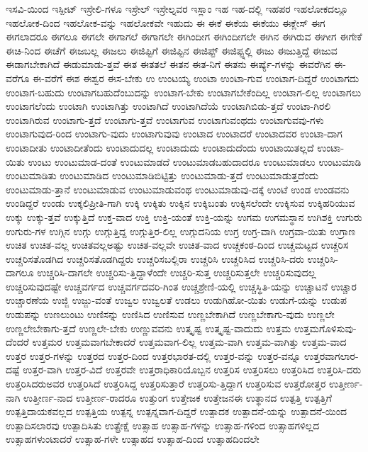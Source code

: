 {ಇಸವಿ-ಯಿಂದ
ಇಸ್ಪೀಟ್
ಇಸ್ರೇಲಿ-ಗಳೂ
ಇಸ್ರೇಲ್
ಇಸ್ರೇಲ್ನವರ
ಇಸ್ಲಾಂ
ಇಹ
ಇಹ-ದಲ್ಲಿ
ಇಹಪರ
ಇಹಲೋಕದಲ್ಲೂ
ಇಹಲೋಕ-ದಿಂದ
ಇಹಲೋಕ-ವನ್ನು
ಇಹಲೋಕವೇ
ಇಹುದು
ಈ
ಈಕೆ
ಈಕೆಯ
ಈಕೆಯು
ಈಕ್ಲೇಸ್
ಈಗ
ಈಗಲಾದರೂ
ಈಗಲೂ
ಈಗಲೇ
ಈಗಾಗಲೆ
ಈಗಾಗಲೇ
ಈಗಿಂದೀಗ
ಈಗಿಂದೀಗಲೇ
ಈಗಿನ
ಈಗಿರುವ
ಈಗೀಗ
ಈಗೇಕೆ
ಈಚಿ-ನಿಂದ
ಈಚೆಗೆ
ಈಜಬಲ್ಲ
ಈಜಲು
ಈಜಿಪ್ಟಿಗೆ
ಈಜಿಪ್ಟಿನ
ಈಜಿಪ್ಟ್
ಈಜಿಪ್ಟ್ನಲ್ಲಿ
ಈಜು
ಈಜುತ್ತಿದ್ದೆ
ಈಜುವ
ಈಡಾಗಬೇಕಾಗಿದೆ
ಈಡುಮಾಡು-ತ್ತವೆ
ಈತ
ಈತತಲೆ
ಈತನ
ಈತ-ನಿಗೆ
ಈತನು
ಈರ್ಷ್ಯೆ-ಗಳನ್ನು
ಈವರೆಗಿನ
ಈ-ವರೆಗೂ
ಈ-ವರೆಗೆ
ಈಶ
ಈಶ್ವರ
ಈಸ-ಬೇಕು
ಉ
ಉಂಟಯ್ಯ
ಉಂಟಾ
ಉಂಟಾ-ಗುವ
ಉಂಟಾಗ-ದಿದ್ದರೆ
ಉಂಟಾಗದು
ಉಂಟಾಗ-ಬಹುದು
ಉಂಟಾಗಬಹುದೆಂಬುದನ್ನು
ಉಂಟಾಗ-ಬೇಕು
ಉಂಟಾಗಬೇಕೆಂದಿಲ್ಲ
ಉಂಟಾಗ-ಲಿಲ್ಲ
ಉಂಟಾಗಲು
ಉಂಟಾಗಲೆಂದು
ಉಂಟಾಗಿ
ಉಂಟಾಗಿತ್ತು
ಉಂಟಾಗಿದೆ
ಉಂಟಾಗಿದೆಯೆ
ಉಂಟಾಗಿಬಿಡು-ತ್ತದೆ
ಉಂಟಾ-ಗಿರಲಿ
ಉಂಟಾಗಿರುವ
ಉಂಟಾಗು-ತ್ತದೆ
ಉಂಟಾಗು-ತ್ತವೆ
ಉಂಟಾಗುವ
ಉಂಟಾಗುವಂಥದು
ಉಂಟಾಗುವವು-ಗಳು
ಉಂಟಾಗುವುದ-ರಿಂದ
ಉಂಟಾಗು-ವುದು
ಉಂಟಾಗುವುವು
ಉಂಟಾದ
ಉಂಟಾದರೆ
ಉಂಟಾದವರ
ಉಂಟಾ-ದಾಗ
ಉಂಟಾದೀತು
ಉಂಟಾದೀತೆಂದು
ಉಂಟಾದುದಲ್ಲ
ಉಂಟಾದುದು
ಉಂಟಾದುದೆಂದು
ಉಂಟಾಯಿತಲ್ಲದೆ
ಉಂಟಾ-ಯಿತು
ಉಂಟು
ಉಂಟುಮಾಡ-ದಂತೆ
ಉಂಟುಮಾಡದೆ
ಉಂಟುಮಾಡಬಹುದಾದರೂ
ಉಂಟುಮಾಡಲು
ಉಂಟುಮಾಡಿ
ಉಂಟುಮಾಡಿತು
ಉಂಟುಮಾಡಿದ
ಉಂಟುಮಾಡಿಬಿಟ್ಟಿತ್ತು
ಉಂಟುಮಾಡು-ತ್ತದೆ
ಉಂಟುಮಾಡುತ್ತದೆಂದು
ಉಂಟುಮಾಡು-ತ್ತಾನೆ
ಉಂಟುಮಾಡುವ
ಉಂಟುಮಾಡುವಂಥ
ಉಂಟುಮಾಡುವು-ದಕ್ಕೆ
ಉಂಟೆ
ಉಂಡ
ಉಂಡವನು
ಉಂಡಿದ್ದರೆ
ಉಂಡು
ಉಕ್ಕಲಿಪ್ರೀತಿ-ಗಾಗಿ
ಉಕ್ಕಿ
ಉಕ್ಕಿತು
ಉಕ್ಕಿನ
ಉಕ್ಕಿಬಂತು
ಉಕ್ಕಿಸಲೆಂದೇ
ಉಕ್ಕಿಸುವ
ಉಕ್ಕಿಹರಿಯುವ
ಉಕ್ಕು
ಉಕ್ಕು-ತ್ತವೆ
ಉಕ್ಕುತ್ತಿದೆ
ಉಕ್ತ-ವಾದ
ಉಕ್ತಿ
ಉಕ್ತಿ-ಯಂತೆ
ಉಕ್ತಿ-ಯನ್ನು
ಉಗಮ
ಉಗಮಸ್ಥಾನ
ಉಗಿಶಕ್ತಿ
ಉಗುರು
ಉಗುರು-ಗಳ
ಉಗ್ಗಿನ
ಉಗ್ಗು
ಉಗ್ಗುತ್ತಿದ್ದ
ಉಗ್ಗುತ್ತಿರ-ಲಿಲ್ಲ
ಉಗ್ಗುದನಿಯ
ಉಗ್ರ
ಉಗ್ರ-ವಾಗಿ
ಉಗ್ರವಾ-ಯಿತು
ಉಗ್ರಾಣ
ಉಚಿತ
ಉಚಿತ-ವಲ್ಲ
ಉಚಿತವಲ್ಲಅಷ್ಟು
ಉಚಿತ-ವಲ್ಲವೇ
ಉಚಿತ-ವಾದ
ಉಚ್ಚಕಂಠ-ದಿಂದ
ಉಚ್ಚಮಟ್ಟದ
ಉಚ್ಚರಿಸ
ಉಚ್ಚರಿಸತೊಡಗಿದ
ಉಚ್ಚರಿಸತೊಡಗಿದ್ದರು
ಉಚ್ಚರಿಸಬಲ್ಲಿರಾ
ಉಚ್ಚರಿಸಿ
ಉಚ್ಚರಿಸಿದ
ಉಚ್ಚರಿಸಿ-ದರು
ಉಚ್ಚರಿಸಿ-ದಾಗಲೂ
ಉಚ್ಚರಿಸಿ-ದಾಗಲೇ
ಉಚ್ಚರಿಸು-ತ್ತಿದ್ದಾಳೆಂದೇ
ಉಚ್ಚರಿ-ಸುತ್ತ
ಉಚ್ಚರಿಸುತ್ತಲೇ
ಉಚ್ಚರಿಸುವುದಲ್ಲ
ಉಚ್ಚರಿಸುವುದಷ್ಟೇ
ಉಚ್ಚವರ್ಗದ
ಉಚ್ಚವರ್ಗದವರಿ-ಗಿಂತ
ಉಚ್ಚಶ್ರೇಣಿ-ಯಲ್ಲಿ
ಉಚ್ಚಸ್ಥಿತಿ-ಯನ್ನು
ಉಚ್ಚಾಟನೆ
ಉಚ್ಚಾರ
ಉಚ್ಚಾರಣೆಯ
ಉಜ್ಜಿ
ಉಜ್ಜು-ವಂತೆ
ಉಜ್ವಲ
ಉಜ್ವಲತೆ
ಉಡಲು
ಉಡುಗಿಹೋ-ಯಿತು
ಉಡುಗೆ-ಯನ್ನು
ಉಡುಪ
ಉಡುಪನ್ನು
ಉಣಲುಂಟು
ಉಣಿಸನ್ನು
ಉಣಿಸಿದ
ಉಣಿಸುವ
ಉಣ್ಣಬೇಕಾಗಿದೆ
ಉಣ್ಣಬೇಕಾಗು-ವುದು
ಉಣ್ಣಲೇ
ಉಣ್ಣಲೇಬೇಕಾಗು-ತ್ತದೆ
ಉಣ್ಣಲೇ-ಬೇಕು
ಉಣ್ಣುವವನು
ಉತ್ಕೃಷ್ಟ
ಉತ್ಕೃಷ್ಟ-ವಾದುದು
ಉತ್ತಮ
ಉತ್ತಮಗೊಳಿಸುವು-ದೆಂದರೆ
ಉತ್ತಮರ
ಉತ್ತಮವಾಗಬೇಕಾದರೆ
ಉತ್ತಮವಾಗ-ಲಿಲ್ಲ
ಉತ್ತಮ-ವಾಗಿ
ಉತ್ತಮ-ವಾಗಿತ್ತು
ಉತ್ತಮ-ವಾದ
ಉತ್ತರ
ಉತ್ತರ-ಗಳನ್ನು
ಉತ್ತರದ
ಉತ್ತರ-ದಿಂದ
ಉತ್ತರಭಾರತ-ದಲ್ಲಿ
ಉತ್ತರ-ವನ್ನು
ಉತ್ತರ-ವನ್ನೂ
ಉತ್ತರವಾಗಲಾರ-ದಷ್ಟೆ
ಉತ್ತರ-ವಾಗಿ
ಉತ್ತರ-ವಿದೆ
ಉತ್ತರವೇ
ಉತ್ತರಾಧಿಕಾರಿಯೊಬ್ಬನ
ಉತ್ತರಿಸ
ಉತ್ತರಿಸಲು
ಉತ್ತರಿಸಿದ
ಉತ್ತರಿಸಿ-ದರು
ಉತ್ತರಿಸಿದರುಅವರ
ಉತ್ತರಿಸಿದೆ
ಉತ್ತರಿಸಿದ್ದ
ಉತ್ತರಿಸುತ್ತಾರೆ
ಉತ್ತರಿಸು-ತ್ತಿದ್ದಾಗ
ಉತ್ತರಿಸುವ
ಉತ್ತರೋತ್ತರ
ಉತ್ತೀರ್ಣ-ನಾಗಿ
ಉತ್ತೀರ್ಣ-ನಾದ
ಉತ್ತೀರ್ಣ-ರಾದರೂ
ಉತ್ತುಂಗ
ಉತ್ತೇಜಕ
ಉತ್ತೇಜನಈ
ಉತ್ಥಾನದ
ಉತ್ಪತ್ತಿ
ಉತ್ಪತ್ತಿಗೆ
ಉತ್ಪತ್ತಿದಾಯಕವಲ್ಲದ
ಉತ್ಪತ್ತಿಯ
ಉತ್ಪನ್ನ
ಉತ್ಪನ್ನವಾಗ-ದಿದ್ದರೆ
ಉತ್ಪಾದಕ
ಉತ್ಪಾದನೆ-ಯನ್ನು
ಉತ್ಪಾದನೆ-ಯಿಂದ
ಉತ್ಪಾದಿಸಲಾರವು
ಉತ್ಪಾದಿಸಿತು
ಉತ್ಪ್ರೇಕ್ಷೆ
ಉತ್ಸಾಹ
ಉತ್ಸಾಹ-ಗಳನ್ನು
ಉತ್ಸಾಹ-ಗಳಿಂದ
ಉತ್ಸಾಹಗಳಿಲ್ಲದ
ಉತ್ಸಾಹಗಳುಂಟಾದರೆ
ಉತ್ಸಾಹ-ಗಳೇ
ಉತ್ಸಾಹದ
ಉತ್ಸಾಹ-ದಿಂದ
ಉತ್ಸಾಹದಿಂದಲೇ
}
